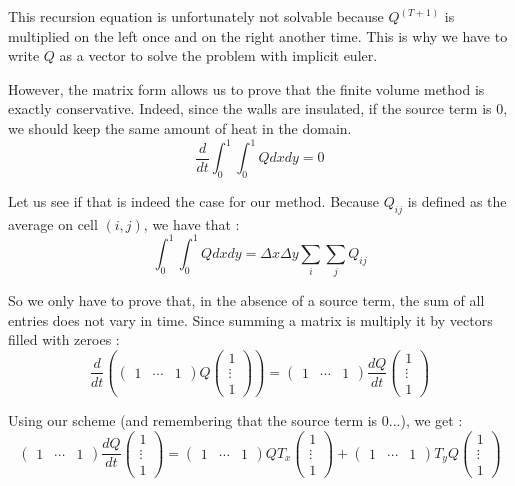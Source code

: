 This recursion equation is unfortunately not solvable because $Q^{(T+1)}$ is multiplied on the left once and on the right another time. This is why we have to write $Q$ as a vector to solve the problem with implicit euler.

However, the matrix form allows us to prove that the finite volume method is exactly conservative. Indeed, since the walls are insulated, if the source term is 0, we should keep the same amount of heat in the domain.
$$\frac{d}{dt}\int_0^1\int_0^1 Qdxdy = 0$$

Let us see if that is indeed the case for our method. Because $Q_{ij}$ is defined as the average on cell $(i,j)$, we have that :
$$\int_0^1\int_0^1 Qdxdy = \Delta x \Delta y \sum_i\sum_j Q_{ij}$$

So we only have to prove that, in the absence of a source term, the sum of all entries does not vary in time. Since summing a matrix is multiply it by vectors filled with zeroes :
$$\frac{d}{dt}(\left(\begin{array}{ccc}
1 & \cdots & 1
\end{array}\right) Q \left(\begin{array}{c}
1 \\ 
\vdots \\ 
1
\end{array}\right) ) = \left(\begin{array}{ccc}
1 & \cdots & 1
\end{array}\right) \frac{dQ}{dt} \left(\begin{array}{c}
1 \\ 
\vdots \\ 
1
\end{array}\right)$$

Using our scheme (and remembering that the source term is 0...), we get : 
$$ \left(\begin{array}{ccc}
1 & \cdots & 1
\end{array}\right) \frac{dQ}{dt} \left(\begin{array}{c}
1 \\ 
\vdots \\ 
1
\end{array}\right)=\left(\begin{array}{ccc}
1 & \cdots & 1
\end{array}\right)QT_x \left(\begin{array}{c}
1 \\ 
\vdots \\ 
1
\end{array}\right) +\left(\begin{array}{ccc}
1 & \cdots & 1
\end{array}\right)T_yQ\left(\begin{array}{c}
1 \\ 
\vdots \\ 
1
\end{array}\right)$$

